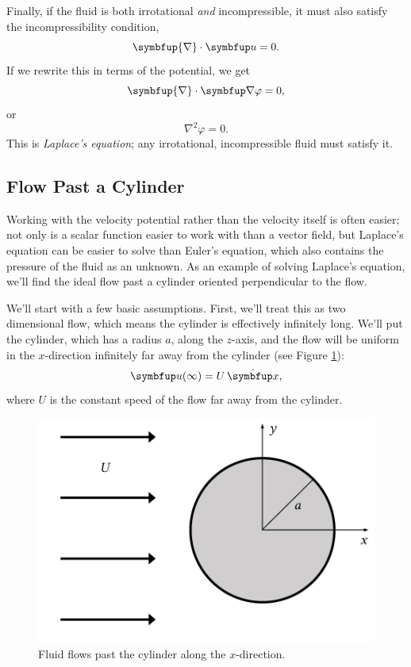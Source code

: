 Finally, if the fluid is both irrotational \emph{and} incompressible, it must also satisfy the incompressibility condition,
\[
\symbfup{\nabla} \cdot \uu = 0.
\]
If we rewrite this in terms of the potential, we get
\[
\symbfup{\nabla} \cdot \grad \varphi = 0,
\]
or
\begin{equation}
\boxed{
\nabla^2 \varphi = 0.
}
\end{equation}
This is \emph{Laplace's equation}; any irrotational, incompressible fluid must satisfy it.





\subsection{Flow Past a Cylinder}
\label{sec_cylinder}

Working with the velocity potential rather than the velocity itself is often easier; not only is a scalar function easier to work with than a vector field, but Laplace's equation can be easier to solve than Euler's equation, which also contains the pressure of the fluid as an unknown.  As an example of solving Laplace's equation, we'll find the ideal flow past a cylinder oriented perpendicular to the flow.

We'll start with a few basic assumptions.  First, we'll treat this as two dimensional flow, which means the cylinder is effectively infinitely long.  We'll put the cylinder, which has a radius $a$, along the $z$-axis, and the flow will be uniform in the $x$-direction infinitely far away from the cylinder (see Figure \ref{fig_cyl_setup2}):
\begin{equation}
\label{eq_uniform}
\uu (\infty) = U \, \unit{x},
\end{equation}
where $U$ is the constant speed of the flow far away from the cylinder.

\begin{figure}
\centering\includegraphics[width=0.7\linewidth]{Figures/Chapter3/fig_cyl_setup}
\caption{Fluid flows past the cylinder along the $x$-direction.}
\label{fig_cyl_setup2}
\end{figure}

